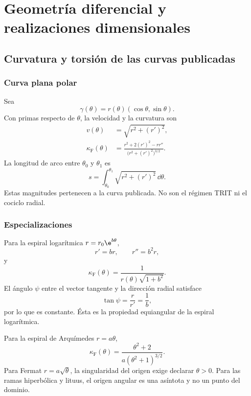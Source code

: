\part{Geometría diferencial y realizaciones dimensionales}

\chapter{Curvatura y torsión de las curvas publicadas}

\section{Curva plana polar}

Sea
\[
 \gamma(\theta)=r(\theta)(\cos\theta,\sin\theta).
\]
Con primas respecto de \(\theta\), la velocidad y la curvatura son
\begin{align}
 v(\theta)&=\sqrt{r^2+(r')^2},\\
 \kappa_{\mathrm{F}}(\theta)&=
 \frac{r^2+2(r')^2-rr''}
 {\bigl(r^2+(r')^2\bigr)^{3/2}}.
 \label{espiral:eq:curvatura-polar}
\end{align}
La longitud de arco entre \(\theta_0\) y \(\theta_1\) es
\[
 s=\int_{\theta_0}^{\theta_1}
 \sqrt{r^2+(r')^2}\,\dd\theta.
\]
Estas magnitudes pertenecen a la curva publicada. No son el régimen TRIT ni
el cociclo radial.

\section{Especializaciones}

Para la espiral logarítmica \(r=r_0\e^{b\theta}\),
\[
 r'=br,\qquad r''=b^2r,
\]
y
\begin{equation}
 \kappa_{\mathrm{F}}(\theta)
 =\frac{1}{r(\theta)\sqrt{1+b^2}}.
 \label{espiral:eq:curvatura-log}
\end{equation}
El ángulo \(\psi\) entre el vector tangente y la dirección radial satisface
\[
 \tan\psi=\frac{r}{r'}=\frac1b,
\]
por lo que es constante. Ésta es la propiedad equiangular de la espiral
logarítmica.

\enlargethispage{4\baselineskip}
Para la espiral de Arquímedes \(r=a\theta\),
\[
 \kappa_{\mathrm{F}}(\theta)
 =\frac{\theta^2+2}{a(\theta^2+1)^{3/2}}.
\]
Para Fermat \(r=a\sqrt\theta\), la singularidad del origen exige declarar
\(\theta>0\). Para las ramas hiperbólica y lituus, el origen angular es una
asíntota y no un punto del dominio.
